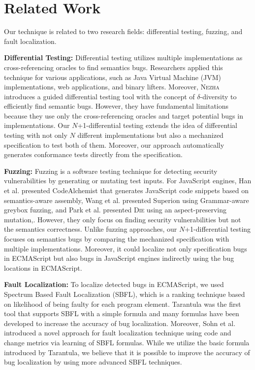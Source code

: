 \section{Related Work}\label{sec:related}

Our technique is related to two research fields: differential testing, fuzzing,
and fault localization.

\textbf{Differential Testing:} Differential testing\cite{???} utilizes multiple
implementations as cross-referencing oracles to find semantics bugs.
Researchers applied this technique for various applications, such as Java
Virtual Machine (JVM) implementations\cite{???}, web applications\cite{???},
and binary lifters\cite{ir-diff-test}.  Moreover, \textsc{Nezha} introduces a
guided differential testing tool with the concept of $\delta$-diversity to
efficiently find semantic bugs.  However, they have fundamental limitations because
they use only the cross-referencing oracles and target potential bugs in
implementations.  Our $N$+1-differential testing extends the idea of
differential testing with not only $N$ different implementations but also a
mechanized specification to test both of them.  Moreover, our approach
automatically generates conformance tests directly from the specification.

\textbf{Fuzzing:} Fuzzing is a software testing technique for detecting security
vulnerabilities by generating or mutating test inputs.  For JavaScript engines,
Han et al.\cite{codealchemist} presented CodeAlchemist that generates JavaScript
code snippets based on semantics-aware assembly, Wang et al.\cite{???}
presented Superion using Grammar-aware greybox fuzzing, and Park et
al.\cite{???} presented \textsc{Die} using an aspect-preserving mutation,.
However, they only focus on finding security vulnerabilities but not the
semantics correctness. Unlike fuzzing approaches, our $N$+1-differential testing
focuses on semantics bugs by comparing the mechanized specification with
multiple implementations.  Moreover, it could localize not only specification
bugs in ECMAScript but also bugs in JavaScript engines indirectly using the bug
locations in ECMAScript.


\textbf{Fault Localization:} To localize detected bugs in ECMAScript, we used
Spectrum Based Fault Localization (SBFL)\cite{???}, which is a ranking technique
based on likelihood of being faulty for each program element.
Tarantula\cite{???, ???} was the first tool that supports SBFL with a simple
formula and many formulas have been developed\cite{???} to increase the accuracy
of bug localization.  Moreover, Sohn et al.\cite{???} introduced a novel
approach for fault localization technique using code and change metrics via
learning of SBFL formulas.  While we utilize the basic formula introduced by
Tarantula, we believe that it is possible to improve the accuracy of bug
localization by using more advanced SBFL techniques.

